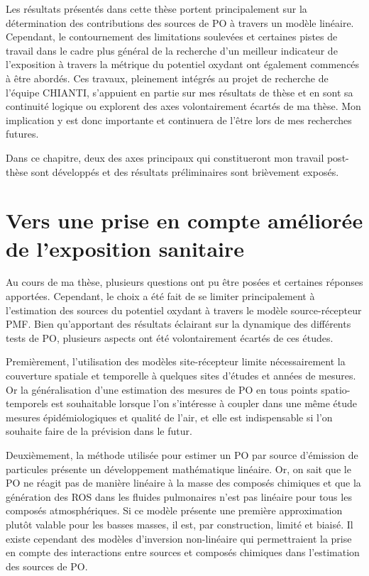 
Les résultats présentés dans cette thèse portent principalement sur la détermination des
contributions des sources de PO à travers un modèle linéaire.  Cependant, le contournement
des limitations soulevées et certaines pistes de travail dans le cadre plus général de la
recherche d'un meilleur indicateur de l'exposition à travers la métrique du potentiel
oxydant ont également commencés à être abordés.  Ces travaux, pleinement intégrés au
projet de recherche de l'équipe CHIANTI, s'appuient en partie sur mes résultats de thèse et
en sont sa continuité logique ou explorent des axes volontairement écartés de ma thèse.
Mon implication y est donc importante et continuera de l'être lors de mes recherches
futures.

Dans ce chapitre, deux des axes principaux qui constitueront mon travail post-thèse sont
développés et des résultats préliminaires sont brièvement exposés.

\section{Vers une prise en compte améliorée de l'exposition sanitaire}%

Au cours de ma thèse, plusieurs questions ont pu être posées et certaines réponses
apportées.  Cependant, le choix a été fait de se limiter principalement à l'estimation des
sources du potentiel oxydant à travers le modèle source-récepteur PMF. Bien qu'apportant
des résultats éclairant sur la dynamique des différents tests de PO, plusieurs aspects ont
été volontairement écartés de ces études.

Premièrement, l'utilisation des modèles site-récepteur limite nécessairement la couverture
spatiale et temporelle à quelques sites d'études et années de mesures. Or la
généralisation d'une estimation des mesures de PO en tous points spatio-temporels est
souhaitable lorsque l'on s'intéresse à coupler dans une même étude mesures
épidémiologiques et qualité de l'air, et elle est indispensable si l'on souhaite faire de
la prévision dans le futur.

Deuxièmement, la méthode utilisée pour estimer un PO par source d'émission de particules
présente un développement mathématique linéaire. Or, on sait que le PO ne réagit pas de
manière linéaire à la masse des composés chimiques et que la génération des ROS dans les
fluides pulmonaires n'est pas linéaire pour tous les composés atmosphériques. Si ce modèle
présente une première approximation plutôt valable pour les basses masses, il est, par
construction, limité et biaisé.  Il existe cependant des modèles d'inversion non-linéaire
qui permettraient la prise en compte des interactions entre sources et composés chimiques
dans l'estimation des sources de PO.

